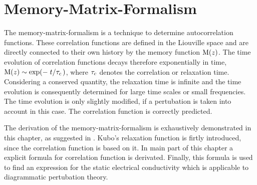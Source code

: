 %
%
%
\chapter{Memory-Matrix-Formalism}
\label{ch:memory matrix formalism} 
%
%
%
The memory-matrix-formalism is a technique to determine autocorrelation functions.
These correlation functions are defined in the Liouville space and are directly connected to their own history by the memory function $\mathrm{M}(z)$. 
The time evolution of correlation functions decays therefore exponentially in time, $\mt{M}(z) \sim \exp(-\flatfrac{t}{\tau_{\mt{c}}})$, where $\tau_{\mathrm{c}}$ denotes the correlation or relaxation time.
Considering a conserved quantity, the relaxation time is infinite and the time evolution is consequently determined for large time scales or small frequencies.
The time evolution is only slightly modified, if a pertubation is taken into account in this case.
The correlation function is correctly predicted.

The derivation of the memory-matrix-formalism is exhaustively demonstrated in this chapter, as suggested in \cite{Forster}.
Kubo's relaxation function is firtly introduced, since the correlation function is based on it.
In main part of this chapter a explicit formula for correlation function is derivated.
Finally, this formula is used to find an expression for the static electrical conductivity which is applicable to diagrammatic pertubation theory.
%
%
